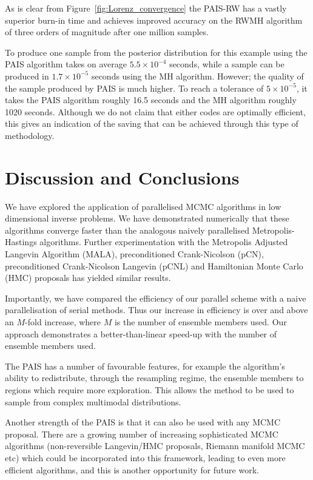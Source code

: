 \documentclass[final]{siamltex}
\begin{document}
As is clear from Figure~\ref{fig:Lorenz_convergence} the PAIS-RW has a vastly superior burn-in time and achieves improved accuracy on the RWMH algorithm of three orders of magnitude after one million samples.

To produce one sample from the posterior distribution for this example
using the PAIS algorithm takes on average $5.5\times 10^{-4}$ seconds,
while a sample can be produced in $1.7\times 10^{-5}$ seconds using
the MH algorithm. However; the quality of the sample produced by PAIS
is much higher. To reach a tolerance of $5\times 10^{-5}$, it takes
the PAIS algorithm roughly 16.5 seconds and the MH algorithm roughly
1020 seconds. Although we do not claim that either codes are optimally
efficient, this gives an indication of the saving that can be achieved
through this type of methodology.


\section{Discussion and Conclusions}\label{Sec:Conc} 

We have explored the application of parallelised MCMC algorithms in
low dimensional inverse problems. We have demonstrated numerically
that these algorithms converge faster than the analogous naively parallelised
Metropolis-Hastings algorithms. Further experimentation with the Metropolis
Adjusted Langevin Algorithm (MALA), preconditioned Crank-Nicolson (pCN),
preconditioned Crank-Nicolson Langevin (pCNL) and Hamiltonian
Monte Carlo (HMC) proposals has yielded similar results\cite{Paul}.

Importantly, we have compared the efficiency of our parallel scheme
with a naive parallelisation of serial methods. Thus our increase in
efficiency is over and above an $M$-fold increase, where $M$ is the
number of ensemble members used. Our approach
demonstrates a better-than-linear speed-up with the number of ensemble
members used. 

The PAIS has a number of favourable features, for example the
algorithm's ability to redistribute, through the resampling regime,
the ensemble members to regions which require more exploration. This allows the
method to be used to sample from complex multimodal distributions.

Another strength of the PAIS is that it can also be used with any MCMC
proposal. There are a growing number of increasing sophisticated MCMC
algorithms (non-reversible Langevin/HMC proposals, Riemann manifold MCMC etc) which could be
incorporated into this framework, leading to even more efficient
algorithms, and this is another opportunity for future work. 
\end{document}

